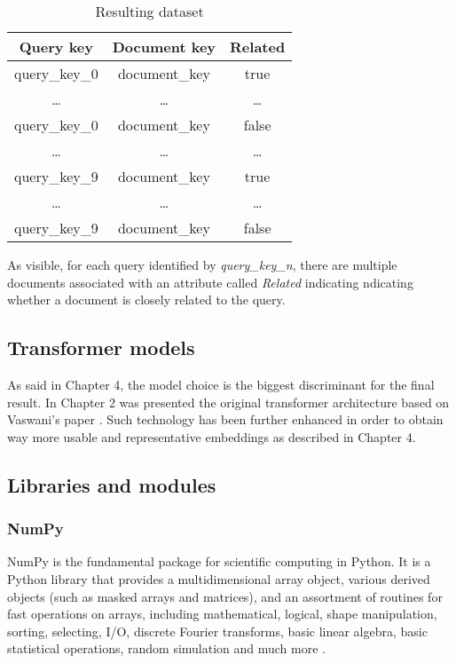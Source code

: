 \documentclass[\main/main.tex]{subfiles}
\begin{document}
\begin{table}[H]
\centering
    \begin{tabular}{||c | c c||} 
     \hline
     Query key & Document key & Related\\ [0.5ex] 
     \hline\hline
     query\_key\_0 & document\_key & true \\ 
     \hline
     \dots & \dots & \dots\\
     \hline
     query\_key\_0 & document\_key & false\\
     \hline
     \dots & \dots & \dots\\
     \hline
     query\_key\_9 & document\_key & true \\ 
     \hline
     \dots & \dots & \dots\\
     \hline
     query\_key\_9 & document\_key & false\\
     \hline
    \end{tabular}
    \caption{Resulting dataset}
     \label{dataset_shape}
\end{table}
As visible, for each query identified by \emph{query\_key\_n}, there are multiple documents associated with an attribute called \emph{Related} indicating ndicating whether a document is closely related to the query.
\subsection{Transformer models}
As said in Chapter 4, the model choice is the biggest discriminant for the final result. In Chapter 2 was presented the original transformer architecture based on Vaswani's paper \cite{vaswani2017attention}. Such technology has been further enhanced in order to obtain way more usable and representative embeddings as described in Chapter 4. 
\subsection{Libraries and modules}
\subsubsection{NumPy}
NumPy is the fundamental package for scientific computing in Python. It is a Python library that provides a multidimensional array object, various derived objects (such as masked arrays and matrices), and an assortment of routines for fast operations on arrays, including mathematical, logical, shape manipulation, sorting, selecting, I/O, discrete Fourier transforms, basic linear algebra, basic statistical operations, random simulation and much more \cite{harris2020array}.
\end{document}
